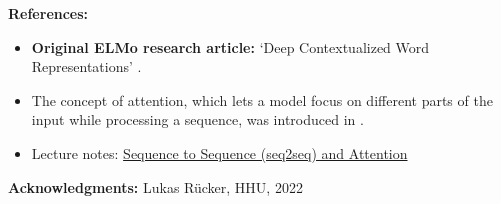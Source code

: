 \documentclass[11pt, a4paper]{amsart}
\begin{document}
\noindent \textbf{References:}
\begin{itemize}
	\item \textbf{Original ELMo research article:} `Deep Contextualized Word Representations' \cite{DBLP:journals/corr/abs-1802-05365}.
	\item The concept of attention, which lets a model focus on different parts of the input while processing a sequence, was introduced in \cite{garg-etal-2019-jointly}.
	\item Lecture notes: \href{https://lena-voita.github.io/nlp_course/seq2seq_and_attention.html}{Sequence to Sequence (seq2seq) and Attention}
\end{itemize}

{
\color{gray}

\noindent \textbf{Acknowledgments:} Lukas Rücker, HHU, 2022
}


\end{document}
